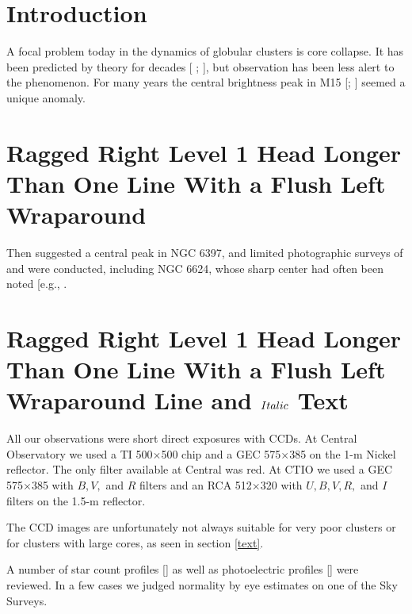\begin{article}
\section{Introduction}

   A focal problem today in the dynamics of globular 
clusters is core collapse.  It has been predicted by 
theory for decades [
; 
], but observation has been 
less alert to the phenomenon.  For many years the 
central brightness peak in M15 [; ] 
seemed a unique anomaly.

\section{Ragged Right Level 1 Head Longer Than One 
Line With a Flush Left Wraparound}

Then  suggested 
a central peak in NGC 6397, and limited photographic 
surveys of  and 
 were 
conducted, including NGC 6624, whose sharp center had 
often been noted [e.g., \markcite{{\it Namias,} 1974]}.

\section{Ragged Right Level 1 Head Longer Than One Line 
With a Flush Left Wraparound Line and 
$\protect \boldmath Italic $ Text}
   All our observations were short direct exposures with CCDs.  
At Central Observatory we used a TI 500$\times$500 chip and a 
GEC 575$\times$385 on the 1-m Nickel reflector.  The only 
filter available at Central was red.  At CTIO we used a GEC 
575$\times$385 with $B, V,$ and $R$ filters and an RCA 
512$\times$320 with $U, B, V, R,$ and $I$ filters on the 
1.5-m reflector.  

   The CCD images are unfortunately not always suitable 
for very poor clusters or for clusters with large cores, 
as seen in section \ref{text}.  

A number of star count profiles [] as well as photoelectric profiles 
[] were reviewed.  In a 
few cases we judged normality by eye estimates on one 
of the Sky Surveys. 


\end{article}
